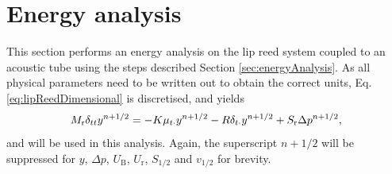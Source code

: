 \section{Energy analysis}
This section performs an energy analysis on the lip reed system coupled to an acoustic tube using the steps described Section \ref{sec:energyAnalysis}. As all physical parameters need to be written out to obtain the correct units, Eq. \eqref{eq:lipReedDimensional} is discretised, and yields
\begin{equation}\label{eq:discLipreedDimensional}
    M_{\text{r}}\delta_{tt}y^{n+1/2} = -K\mu_{t\cdot}y^{n+1/2}-R\delta_{t\cdot}y^{n+1/2} + S_\text{r}\Delta p^{n+1/2},
\end{equation} 
and will be used in this analysis. Again, the superscript $n+1/2$ will be suppressed for $y$, $\Delta p$, $U_\text{B}$, $U_\text{r}$, $S_{1/2}$ and $v_{1/2}$ for brevity.

